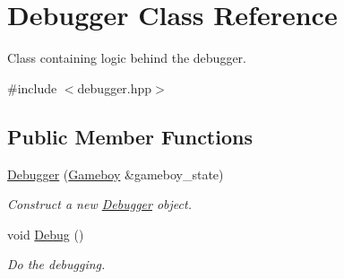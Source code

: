 \hypertarget{classDebugger}{}\section{Debugger Class Reference}
\label{classDebugger}


Class containing logic behind the debugger.  




{\ttfamily \#include $<$debugger.\+hpp$>$}

\subsection*{Public Member Functions}
\begin{DoxyCompactItemize}
\item 
\mbox{\hyperlink{classDebugger_a75b2a03d64e618c422e5082b39c5dc73}{Debugger}} (\mbox{\hyperlink{classGameboy}{Gameboy}} \&gameboy\+\_\+state)
\begin{DoxyCompactList}\small\item\em Construct a new \mbox{\hyperlink{classDebugger}{Debugger}} object. \end{DoxyCompactList}\item 
\mbox{\label{classDebugger_a1c735f679f4e5195a976432156a9d9b1}} 
void \mbox{\hyperlink{classDebugger_a1c735f679f4e5195a976432156a9d9b1}{Debug}} ()
\begin{DoxyCompactList}\small\item\em Do the debugging. \end{DoxyCompactList}\end{DoxyCompactItemize}
